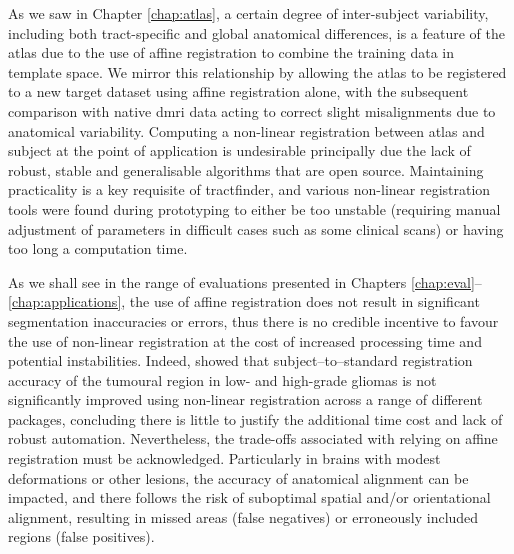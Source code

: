 As we saw in Chapter \ref{chap:atlas}, a certain degree of inter-subject variability, including both tract-specific and global anatomical differences, is a feature of the atlas due to the use of affine registration to combine the training data in template space.
We mirror this relationship by allowing the atlas to be registered to a new target dataset using affine registration alone, with the subsequent comparison with native \gls{dmri} data acting to correct slight misalignments due to anatomical variability.
Computing a non-linear registration between atlas and subject at the point of application is undesirable principally due the lack of robust, stable and generalisable algorithms that are open source.
Maintaining practicality is a key requisite of tractfinder, and various non-linear registration tools were found during prototyping to either be too unstable (requiring manual adjustment of parameters in difficult cases such as some clinical scans) or having too long a computation time\autocite{Visser2020}.

As we shall see in the range of evaluations presented in Chapters \ref{chap:eval}--\ref{chap:applications}, the use of affine registration does not result in significant segmentation inaccuracies or errors, thus there is no credible incentive to favour the use of non-linear registration at the cost of increased processing time and potential instabilities.
Indeed, \textcite{Visser2020} showed that subject--to--standard registration accuracy of the tumoural region in low- and high-grade gliomas is not significantly improved using non-linear registration across a range of different packages, concluding there is little to justify the additional time cost and lack of robust automation.
Nevertheless, the trade-offs associated with relying on affine registration must be acknowledged.
Particularly in brains with modest deformations or other lesions, the accuracy of anatomical alignment can be impacted, and there follows the risk of suboptimal spatial and/or orientational alignment, resulting in missed areas (false negatives) or erroneously included regions (false positives).


